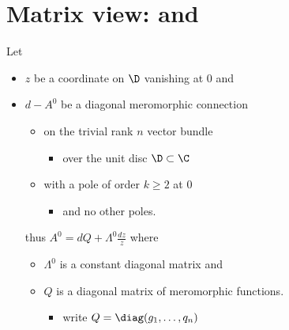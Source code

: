 \section{Matrix view: \cite{boalch} and \cite{thboalch}} %
Let
\begin{itemize}
  \item $z$ be a coordinate on $\D$ vanishing at $0$ and
  \item $d-A^0$ be a diagonal meromorphic connection
    \begin{itemize}
      \item on the trivial rank $n$ vector bundle
        \begin{itemize}
          \item over the unit disc $\D\subset\C$
        \end{itemize}
      \item with a pole of order $k\geq2$ at $0$
        \begin{itemize}
          \item and no other poles.
        \end{itemize}
    \end{itemize}
    thus $A^0=dQ+\Lambda^0\frac{dz}{z}$ where
    \begin{itemize}
      \item $\Lambda^0$ is a constant diagonal matrix and
      \item $Q$ is a diagonal matrix of meromorphic functions.
        \begin{itemize}
          \item write $Q=\diag(g_1,\dots,q_n)$
        \end{itemize}
    \end{itemize}
\end{itemize}
